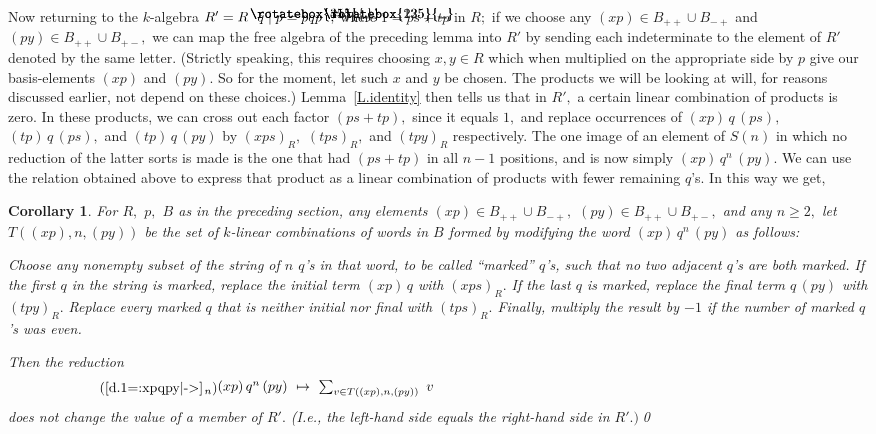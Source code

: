\documentclass{amsart}
\newtheorem{corollary}[theorem]{Corollary}
\DeclareRobustCommand{\lang}{\begin{picture}(5,7)
\put(1.2,2.5){\rotatebox{45}{\line(1,0){6.0}}}
\put(1.2,2.5){\rotatebox{315}{\line(1,0){6.0}}}
\end{picture}\kern.16em}
\DeclareRobustCommand{\rang}{\kern.1em\begin{picture}(5,7)
\put(.1,2.5){\rotatebox{135}{\line(1,0){6.0}}}
\put(.1,2.5){\rotatebox{225}{\line(1,0){6.0}}}
\end{picture}}
\begin{document}
Now returning to the $\!k\!$-algebra
$R'=R\lang q\mid p=pqp\rang,$ where $1=ps+tp$
in $R;$ if we choose any $(xp)\in B_{++}\cup B_{-+}$
and $(py)\in B_{++}\cup B_{+-},$ we can map the free algebra of
the preceding lemma into $R'$ by sending each indeterminate
to the element of $R'$ denoted by the same letter.
(Strictly speaking, this requires choosing $x,y\in R$ which
when multiplied on the appropriate side by $p$ give our
basis-elements $(xp)$ and $(py).$
So for the moment, let such $x$ and $y$ be chosen.
The products we will be looking at will, for reasons
discussed earlier, not depend on these choices.)
Lemma~\ref{L.identity} then tells us
that in $R',$ a certain linear combination of products is zero.
In these products, we can cross out each factor $(ps+tp),$
since it equals $1,$ and replace occurrences of $(xp)\,q\,(ps),$
$(tp)\,q\,(ps),$ and $(tp)\,q\,(py)$ by $(xps)_R,$
$(tps)_R,$ and $(tpy)_R$ respectively.
The one image of an element of
$S(n)$ in which no reduction of the latter sorts is made
is the one that had $(ps+tp)$ in all $n{-}1$ positions,
and is now simply $(xp)\,q^n\,(py).$
We can use the relation
obtained above to express that product as a linear combination of
products with fewer remaining $\!q\!$'s.
In this way we get,

\begin{corollary}\label{C.identity}
For $R,$ $p,$ $B$ as in the preceding section, any elements
$(xp)\in B_{++}\cup B_{-+},$ $(py)\in B_{++}\cup B_{+-},$
and any $n\geq 2,$
let $T((xp),n,(py))$ be the set of $\!k\!$-linear combinations
of words in $B$ formed by
modifying the word $(xp)\,q^n\,(py)$ as follows:

Choose any {\em nonempty} subset of the string of $n$ $\!q\!$'s
in that word, to be called ``marked'' $\!q\!$'s, such that
no two adjacent $\!q\!$'s are both marked.
If the first $q$ in the string is marked, replace the initial
term $(xp)\,q$ with $(xps)_R.$
If the last $q$ is marked, replace the final
term $q\,(py)$ with $(tpy)_R.$
Replace every marked $q$ that is neither initial nor final
with $(tps)_R.$
Finally, multiply the result by $-1$ if the number of marked $\!q\!$'s
was {\em even}.

Then the reduction
\begin{equation}\tag{{{\setlength{\mathsurround}{0em}\ref{d.1=:xpqpy|->}\kern.1em$_{{n}}$}}}\begin{minipage}[c]{35pc}
$(xp)\,q^n\,(py)\ \mapsto\ \sum_{v\in T((xp),n,(py))}\ v$
\end{minipage}\end{equation}
does not change the value of a member of $R'.$
\textup{(}I.e., the left-hand side equals the right-hand side
in $R'.)$\qed
\end{corollary}
\end{document}
